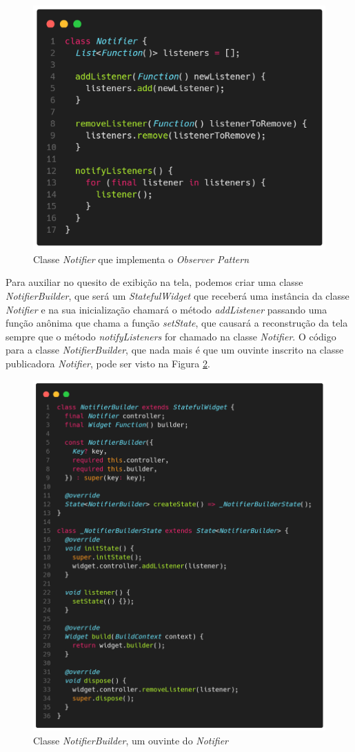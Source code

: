 \documentclass[12pt, %
openright, 
oneside, %
a4paper,    %
brazil]{facom-ufu-abntex2}
\begin{document}
\begin{figure}[ht]
    \centering
    \includegraphics[width=.65\textwidth, trim={0 30 0 100}, clip]{figures/states/notifier.png}
    \caption{Classe \textit{Notifier} que implementa o \textit{Observer Pattern}}
    \label{fig:notifier}
\end{figure}
Para auxiliar no quesito de exibição na tela, podemos criar uma classe \textit{NotifierBuilder}, que será um \textit{StatefulWidget} que receberá uma instância da classe \textit{Notifier} e na sua inicialização chamará o método \textit{addListener} passando uma função anônima que chama a função \textit{setState}, que causará a reconstrução da tela sempre que o método \textit{notifyListeners} for chamado na classe \textit{Notifier}. O código para a classe \textit{NotifierBuilder}, que nada mais é que um ouvinte inscrito na classe publicadora \textit{Notifier}, pode ser visto na Figura \ref{fig:notifier_builder}.

\begin{figure}[ht]
    \centering
    \includegraphics[width=.65\textwidth, trim={0 30 0 100}, clip]{figures/states/notifier_builder.png}
    \caption{Classe \textit{NotifierBuilder}, um ouvinte do \textit{Notifier}}
    \label{fig:notifier_builder}
\end{figure}
\end{document}
